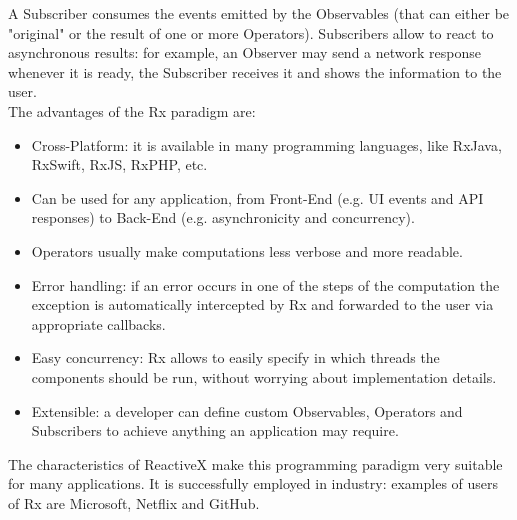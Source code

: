 \documentclass[11pt,a4paper,notitlepage]{article}
\begin{document}
A Subscriber consumes the events emitted by the Observables (that can either be "original" or the result of one or more Operators). Subscribers allow to react to asynchronous results: for example, an Observer may send a network response whenever it is ready, the Subscriber receives it and shows the information to the user.\bigskip \\
The advantages of the Rx paradigm are:
\begin{itemize}
	\item Cross-Platform: it is available in many programming languages, like RxJava, RxSwift, RxJS, RxPHP, etc.
	\item Can be used for any application, from Front-End (e.g. UI events and API responses) to Back-End (e.g. asynchronicity and concurrency).
	\item Operators usually make computations less verbose and more readable.
	\item Error handling: if an error occurs in one of the steps of the computation the exception is automatically intercepted by Rx and forwarded to the user via appropriate callbacks.
	\item Easy concurrency: Rx allows to easily specify in which threads the components should be run, without worrying about implementation details.
	\item Extensible: a developer can define custom Observables, Operators and Subscribers to achieve anything an application may require.
\end{itemize}
The characteristics of ReactiveX make this programming paradigm very suitable for many applications. It is successfully employed in industry: examples of users of Rx are Microsoft, Netflix and GitHub.
\end{document}
